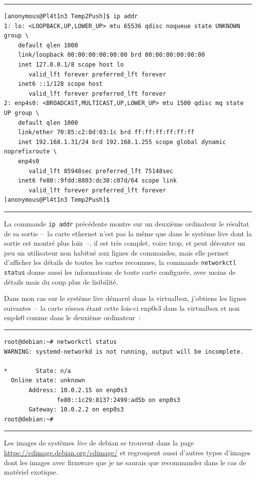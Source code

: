 \documentclass[12pt, a4paper]{report}
\begin{document}
\noindent\rule{\linewidth}{0.5pt}
\begin{verbatim}
[anonymous@Pl4t1n3 Temp2Push]$ ip addr
1: lo: <LOOPBACK,UP,LOWER_UP> mtu 65536 qdisc noqueue state UNKNOWN group \
	default qlen 1000
    link/loopback 00:00:00:00:00:00 brd 00:00:00:00:00:00
    inet 127.0.0.1/8 scope host lo
       valid_lft forever preferred_lft forever
    inet6 ::1/128 scope host 
       valid_lft forever preferred_lft forever
2: enp4s0: <BROADCAST,MULTICAST,UP,LOWER_UP> mtu 1500 qdisc mq state UP group \
	default qlen 1000
    link/ether 70:85:c2:0d:03:1c brd ff:ff:ff:ff:ff:ff
    inet 192.168.1.31/24 brd 192.168.1.255 scope global dynamic noprefixroute \
    enp4s0
       valid_lft 85948sec preferred_lft 75148sec
    inet6 fe80::9fdd:8803:dc38:c07d/64 scope link 
       valid_lft forever preferred_lft forever
[anonymous@Pl4t1n3 Temp2Push]$
\end{verbatim}
\rule{\linewidth}{0.5pt}

La commande \texttt{ip addr} précédente montre sur un deuxième ordinateur le résultat de sa sortie --~la carte ethernet n'est pas la même que dans le système live dont la sortie est montré plus loin~--, il est très complet, voire trop, et peut dérouter un peu un utilisateur non habitué aux lignes de commandes, mais elle permet d'afficher les détails de toutes les cartes reconnues, la commande \texttt{networkctl status} donne aussi les informations de toute carte configurée, avec moins de détails mais du coup plus de lisibilité.

Dans mon cas sur le système live démarré dans la virtualbox, j'obtiens les lignes suivantes --~la carte réseau étant cette fois-ci enp0s3 dans la virtualbox et non enp4s0 comme dans le deuxième ordinateur~:

\noindent\rule{\linewidth}{0.5pt}
\begin{verbatim}
root@debian:~# networkctl status
WARNING: systemd-networkd is not running, output will be incomplete.

*        State: n/a
  Online state: unknown
       Address: 10.0.2.15 on enp0s3
               fe80::1c29:8137:2499:ad5b on enp0s3
       Gateway: 10.0.2.2 on enp0s3
root@debian:~#
\end{verbatim}
\rule{\linewidth}{0.5pt}

Les images de systèmes \emph{live} de debian se trouvent dans la page \url{https://cdimage.debian.org/cdimage/} et regroupent aussi d'autres types d'images dont les images avec firmware que je ne saurais que recommander dans le cas de matériel exotique.
\end{document}
